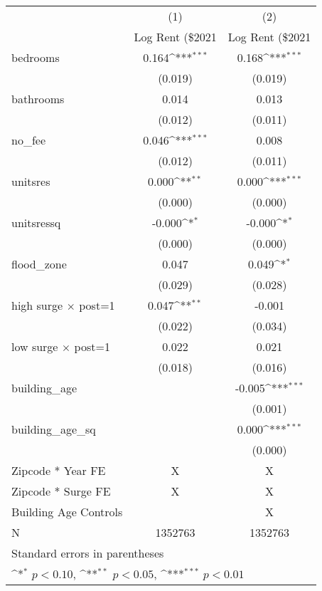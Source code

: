 {
\def\sym#1{\ifmmode^{#1}\else\(^{#1}\)\fi}
\begin{tabular}{l*{2}{c}}
\toprule
                    &\multicolumn{1}{c}{(1)}&\multicolumn{1}{c}{(2)}\\
                    &\multicolumn{1}{c}{Log Rent (\$2021}&\multicolumn{1}{c}{Log Rent (\$2021}\\
\midrule
bedrooms            &       0.164\sym{***}&       0.168\sym{***}\\
                    &     (0.019)         &     (0.019)         \\
\addlinespace
bathrooms           &       0.014         &       0.013         \\
                    &     (0.012)         &     (0.011)         \\
\addlinespace
no\_fee              &       0.046\sym{***}&       0.008         \\
                    &     (0.012)         &     (0.011)         \\
\addlinespace
unitsres            &       0.000\sym{**} &       0.000\sym{***}\\
                    &     (0.000)         &     (0.000)         \\
\addlinespace
unitsressq          &      -0.000\sym{*}  &      -0.000\sym{*}  \\
                    &     (0.000)         &     (0.000)         \\
\addlinespace
flood\_zone          &       0.047         &       0.049\sym{*}  \\
                    &     (0.029)         &     (0.028)         \\
\addlinespace
high surge $\times$ post=1&       0.047\sym{**} &      -0.001         \\
                    &     (0.022)         &     (0.034)         \\
\addlinespace
low surge $\times$ post=1&       0.022         &       0.021         \\
                    &     (0.018)         &     (0.016)         \\
\addlinespace
building\_age        &                     &      -0.005\sym{***}\\
                    &                     &     (0.001)         \\
\addlinespace
building\_age\_sq     &                     &       0.000\sym{***}\\
                    &                     &     (0.000)         \\
\midrule
Zipcode * Year FE      &X         &X        \\
Zipcode * Surge  FE    &X        &X        \\
Building Age Controls  &         &X         \\
N                   &     1352763         &     1352763         \\
\bottomrule
\multicolumn{3}{l}{\footnotesize Standard errors in parentheses}\\
\multicolumn{3}{l}{\footnotesize \sym{*} \(p<0.10\), \sym{**} \(p<0.05\), \sym{***} \(p<0.01\)}\\
\end{tabular}
}
